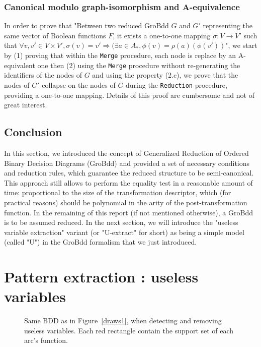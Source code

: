 \documentclass[a4paper,10pt]{article}
\newcommand{\includeframe}[4]{\makebox[#2\linewidth]{\texttt{[image: \#4]}}}
\begin{document}
\subsubsection{Canonical modulo graph-isomorphism and A-equivalence}
In order to prove that "Between two reduced GroBdd $G$ and $G'$ representing the same vector of Boolean functions $F$, it exists a one-to-one mapping $\sigma : V \longrightarrow V'$ such that $\forall v, v' \in V \times V', \sigma(v) = v' \Rightarrow (\exists a \in A_{*}, \phi(v) = \rho(a)(\phi(v'))$", we start by (1) proving that within the \texttt{Merge} procedure, each node is replace by an A-equivalent one then (2) using the \texttt{Merge} procedure without re-generating the identifiers of the nodes of $G$ and using the property (2.c), we prove that the nodes of $G'$ collapse on the nodes of $G$ during the \texttt{Reduction} procedure, providing a one-to-one mapping.
Details of this proof are cumbersome and not of great interest.


\subsection{Conclusion}

In this section, we introduced the concept of Generalized Reduction of Ordered Binary Decision Diagrams (GroBdd) and provided a set of necessary conditions and reduction rules, which guarantee the reduced structure to be semi-canonical. This approach still allows to perform the equality test in a reasonable amount of time: proportional to the size of the transformation descriptor, which (for practical reasons) should be polynomial in the arity of the post-transformation function.
In the remaining of this report (if not mentioned otherwise), a GroBdd is to be assumed reduced.
In the next section, we will introduce the "useless variable extraction" variant (or "U-extract" for short) as being a simple model (called "U") in the GroBdd formalism that we just introduced.

\section{Pattern extraction : useless variables}
\begin{figure}
\centering
\includeframe{3}{1}{}{draws.pdf}
\caption{Same BDD as in Figure~\ref{draws1}, when detecting and removing useless variables. Each red rectangle contain the support set of each arc's function.}
\label{draws3}
\end{figure}
\end{document}
